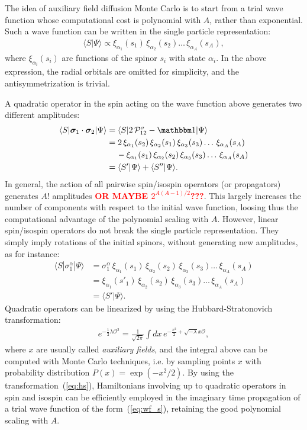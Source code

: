\documentclass[aps,prc,twocolumn,superscriptaddress,floatfix]{revtex4-1}
\newcommand{\red}[1]{\protect\textcolor{red}{#1}}
\begin{document}
The idea of auxiliary field diffusion Monte Carlo is to start from a trial wave function
whose computational cost is polynomial with $A$, rather than exponential.
Such a wave function can be written in the single particle representation:
\begin{align}
\langle S|\Psi\rangle\propto\xi_{\alpha_1}(s_1)\,\xi_{\alpha_2}(s_2)\dots\,\xi_{\alpha_A}(s_A) ,
\label{eq:wf_s}
\end{align}
where $\xi_{\alpha_i}(s_i)$ are functions of the spinor $s_i$ with state $\alpha_i$. 
In the above expression, the radial orbitals are omitted for simplicity, 
and the antisymmetrization is trivial.

A quadratic operator in the spin acting on the wave function above generates two different amplitudes:
\begin{align}
\langle S|\bm\sigma_1\cdot\bm\sigma_2|\Psi\rangle & =\langle S|2\,\mathcal P_{12}^\sigma-\mathbbm1|\Psi\rangle \nonumber \\
& =2\,\xi_{\alpha_1}(s_2)\,\xi_{\alpha_2}(s_1)\,\xi_{\alpha_3}(s_3)\dots\,\xi_{\alpha_A}(s_A) \nonumber \\
& \quad\,-\xi_{\alpha_1}(s_1)\,\xi_{\alpha_2}(s_2)\,\xi_{\alpha_3}(s_3)\dots\,\xi_{\alpha_A}(s_A) \nonumber \\
& =\langle S'|\Psi\rangle+\langle S''|\Psi\rangle .
\end{align}
In general, the action of all pairwise spin/isospin operators (or propagators) generates $A!$ amplitudes \red{\bf OR MAYBE $2^{A(A-1)/2}$???}.
This largely increases the number of components with respect to the initial wave function, loosing thus the 
computational advantage of the polynomial scaling with $A$.
However, linear spin/isospin operators do not break the single particle representation. 
They simply imply rotations of the initial spinors, without generating new amplitudes, as for instance:
\begin{align}
\langle S|\sigma_1^\alpha|\Psi\rangle &=
\sigma_1^\alpha\,\xi_{\alpha_1}(s_1)\,\xi_{\alpha_2}(s_2)\,\xi_{\alpha_3}(s_3)\dots\,\xi_{\alpha_A}(s_A) \nonumber \\
& =\xi_{\alpha_1}(s'_1)\,\xi_{\alpha_2}(s_2)\,\xi_{\alpha_3}(s_3)\dots\,\xi_{\alpha_A}(s_A) \nonumber \\
& =\langle S'|\Psi\rangle .
\end{align}
Quadratic operators can be linearized by using the Hubbard-Stratonovich transformation:
\begin{align}
e^{-\frac{1}{2}\lambda \mathcal O^2}=\frac{1}{\sqrt{2\pi}}\int dx\, e^{-\frac{x^2}{2}+\sqrt{-\lambda}x\mathcal O} ,
\label{eq:hs}
\end{align}
where $x$ are usually called \emph{auxiliary fields}, and the integral above can
be computed with Monte Carlo techniques, i.e. by sampling points $x$ with  
probability distribution $P(x)=\exp(-x^2/2)$. By using the transformation~(\ref{eq:hs}),
Hamiltonians involving up to quadratic operators in spin and isospin can be efficiently
employed in the imaginary time propagation of a trial wave function of the form~(\ref{eq:wf_s}),
retaining the good polynomial scaling with $A$.
\end{document}
